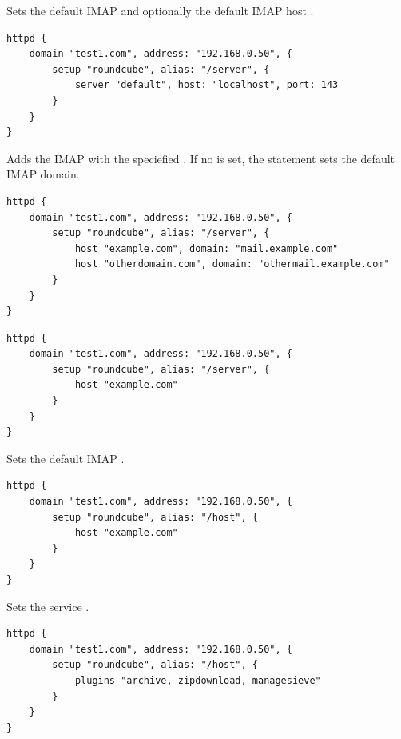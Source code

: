 Sets the default IMAP  and optionally the default IMAP host .

\begin{lstlisting}[style=Java]
httpd {
    domain "test1.com", address: "192.168.0.50", {
        setup "roundcube", alias: "/server", {
            server "default", host: "localhost", port: 143
        }
    }
}
\end{lstlisting}


Adds the IMAP  with the speciefied . If no 
is set, the statement sets the default IMAP domain.

\begin{lstlisting}[style=Java]
httpd {
    domain "test1.com", address: "192.168.0.50", {
        setup "roundcube", alias: "/server", {
            host "example.com", domain: "mail.example.com"
            host "otherdomain.com", domain: "othermail.example.com"
        }
    }
}
\end{lstlisting}

\begin{lstlisting}[style=Java]
httpd {
    domain "test1.com", address: "192.168.0.50", {
        setup "roundcube", alias: "/server", {
            host "example.com"
        }
    }
}
\end{lstlisting}


Sets the default IMAP .

\begin{lstlisting}[style=Java]
httpd {
    domain "test1.com", address: "192.168.0.50", {
        setup "roundcube", alias: "/host", {
            host "example.com"
        }
    }
}
\end{lstlisting}


Sets the service .

\begin{lstlisting}[style=Java]
httpd {
    domain "test1.com", address: "192.168.0.50", {
        setup "roundcube", alias: "/host", {
            plugins "archive, zipdownload, managesieve"
        }
    }
}
\end{lstlisting}

